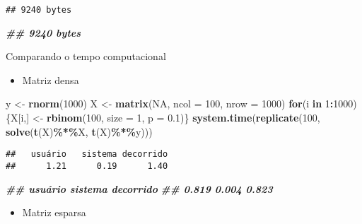 \documentclass[
]{article}
\newenvironment{Shaded}{\begin{snugshade}}{\end{snugshade}}
\newcommand{\AttributeTok}[1]{\textcolor[rgb]{0.13,0.29,0.53}{#1}}
\newcommand{\ConstantTok}[1]{\textcolor[rgb]{0.56,0.35,0.01}{#1}}
\newcommand{\ControlFlowTok}[1]{\textcolor[rgb]{0.13,0.29,0.53}{\textbf{#1}}}
\newcommand{\DecValTok}[1]{\textcolor[rgb]{0.00,0.00,0.81}{#1}}
\newcommand{\DocumentationTok}[1]{\textcolor[rgb]{0.56,0.35,0.01}{\textbf{\textit{#1}}}}
\newcommand{\FloatTok}[1]{\textcolor[rgb]{0.00,0.00,0.81}{#1}}
\newcommand{\FunctionTok}[1]{\textcolor[rgb]{0.13,0.29,0.53}{\textbf{#1}}}
\newcommand{\NormalTok}[1]{#1}
\newcommand{\OtherTok}[1]{\textcolor[rgb]{0.56,0.35,0.01}{#1}}
\newcommand{\SpecialCharTok}[1]{\textcolor[rgb]{0.81,0.36,0.00}{\textbf{#1}}}
\providecommand{\tightlist}{%
  \setlength{\itemsep}{0pt}\setlength{\parskip}{0pt}}
\begin{document}
\begin{verbatim}
## 9240 bytes
\end{verbatim}

\begin{Shaded}
\begin{Highlighting}[]
\DocumentationTok{\#\# 9240 bytes}
\end{Highlighting}
\end{Shaded}

Comparando o tempo computacional

\begin{itemize}
\tightlist
\item
  Matriz densa
\end{itemize}

\begin{Shaded}
\begin{Highlighting}[]
\NormalTok{y }\OtherTok{\textless{}{-}} \FunctionTok{rnorm}\NormalTok{(}\DecValTok{1000}\NormalTok{)}
\NormalTok{X }\OtherTok{\textless{}{-}} \FunctionTok{matrix}\NormalTok{(}\ConstantTok{NA}\NormalTok{, }\AttributeTok{ncol =} \DecValTok{100}\NormalTok{, }\AttributeTok{nrow =} \DecValTok{1000}\NormalTok{)}
\ControlFlowTok{for}\NormalTok{(i }\ControlFlowTok{in} \DecValTok{1}\SpecialCharTok{:}\DecValTok{1000}\NormalTok{) \{X[i,] }\OtherTok{\textless{}{-}} \FunctionTok{rbinom}\NormalTok{(}\DecValTok{100}\NormalTok{, }\AttributeTok{size =} \DecValTok{1}\NormalTok{, }\AttributeTok{p =} \FloatTok{0.1}\NormalTok{)\}}
\FunctionTok{system.time}\NormalTok{(}\FunctionTok{replicate}\NormalTok{(}\DecValTok{100}\NormalTok{, }\FunctionTok{solve}\NormalTok{(}\FunctionTok{t}\NormalTok{(X)}\SpecialCharTok{\%*\%}\NormalTok{X, }\FunctionTok{t}\NormalTok{(X)}\SpecialCharTok{\%*\%}\NormalTok{y)))}
\end{Highlighting}
\end{Shaded}

\begin{verbatim}
##   usuário   sistema decorrido 
##      1.21      0.19      1.40
\end{verbatim}

\begin{Shaded}
\begin{Highlighting}[]
\DocumentationTok{\#\# usuário sistema decorrido}
\DocumentationTok{\#\# 0.819 0.004 0.823}
\end{Highlighting}
\end{Shaded}

\begin{itemize}
\tightlist
\item
  Matriz esparsa
\end{itemize}
\end{document}
